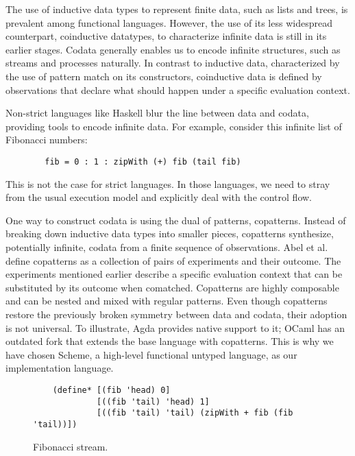 The use of inductive data types to represent finite data, such as lists and trees, is prevalent among functional languages.
However, the use of its less widespread counterpart, coinductive datatypes, to characterize infinite data is still in its earlier stages.
Codata generally enables us to encode infinite structures, such as streams and processes naturally.
In contrast to inductive data, characterized by the use of pattern match on its constructors, coinductive data is defined by observations that declare what should happen under a specific evaluation context.

Non-strict languages like Haskell blur the line between data and codata, providing tools to encode infinite data.
For example, consider this infinite list of Fibonacci numbers:
    \begin{verbatim}
        fib = 0 : 1 : zipWith (+) fib (tail fib)
    \end{verbatim}
This is not the case for strict languages. In those languages, we need to stray from the usual execution model and explicitly deal with the control flow.

One way to construct codata is using the dual of patterns, copatterns.
Instead of breaking down inductive data types into smaller pieces, copatterns synthesize, potentially infinite, codata from a finite sequence of observations.
Abel et al. \cite{APTS2013C} define copatterns as a collection of pairs of experiments and their outcome.
The experiments mentioned earlier describe a specific evaluation context that can be substituted by its outcome when comatched.
Copatterns are highly composable and can be nested and mixed with regular patterns.
Even though copatterns restore the previously broken symmetry between data and codata, their adoption is not universal.
To illustrate, Agda provides native support to it; OCaml has an outdated fork that extends the base language with copatterns.
This is why we have chosen Scheme, a high-level functional untyped language, as our implementation language.

\begin{figure}
    \begin{verbatim}
    (define* [(fib 'head) 0]
             [((fib 'tail) 'head) 1]
             [((fib 'tail) 'tail) (zipWith + fib (fib 'tail))])
    \end{verbatim}
    \caption{Fibonacci stream.}
    \label{fig:ex-fib}
\end{figure}


